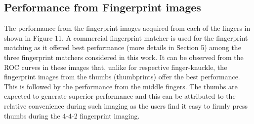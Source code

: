 \subsection{Performance from Fingerprint images}

The performance from the fingerprint images acquired from each of the fingers in shown in Figure 11. A commercial fingerprint matcher is used for the fingerprint matching as it offered best performance (more details in Section 5) among the three fingerprint matchers considered in this work. It can be observed from the ROC curves in these images that, unlike for respective finger-knuckle, the fingerprint images from the thumbs (thumbprints) offer the best performance. This is followed by the performance from the middle fingers. The thumbs are expected to generate superior performance and this can be attributed to the relative convenience during such imaging as the users find it easy to firmly press thumbs during the 4-4-2 fingerprint imaging. 
